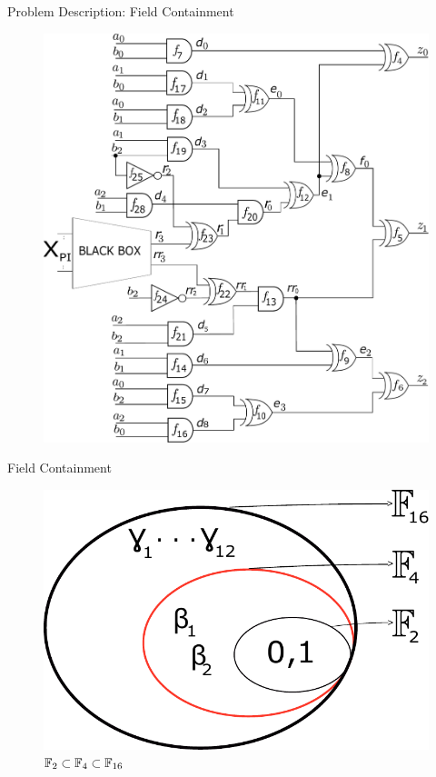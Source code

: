 \begin{frame}{\large Problem Description: Field Containment}
\begin{figure}[hbt]
\centering
\includegraphics[scale=0.26]{mas_3_ddc_mfr_b_bb.pdf}
\caption*{
}
\end{figure}
\end{frame}

\begin{frame}{\large Field Containment}
\begin{figure}[hbt]
\centering
    \includegraphics[scale = 0.5]{field_containment.pdf}
    \vspace{0.1in}
    \caption*{\large ${\mathbb{F}}_2 \subset {\mathbb{F}}_{4} \subset {\mathbb{F}}_{16}$}
    \label{fig:field_cont}
\end{figure}
\end{frame}

